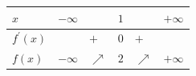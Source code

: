 \documentclass[border=.4pt]{standalone}
\begin{document}
\color{ink}\begin{tabular}{|>{\centering\arraybackslash}m{1.7cm}|>{\centering\arraybackslash}m{1.25cm}|>{\centering\arraybackslash}m{1.25cm}|>{\centering\arraybackslash}m{1.25cm}|>{\centering\arraybackslash}m{1.25cm}|>{\centering\arraybackslash}m{1.25cm}|}\hline
\cellcolor{head}$x$ & \cellcolor{head}$-\infty$ & \cellcolor{head} & \cellcolor{head}$1$ & \cellcolor{head} & \cellcolor{head}$+\infty$ \\ \hline
\cellcolor{head}$f^{\prime}(x)$ &  & $+$ & $0$ & $+$ &  \\ \hline
\cellcolor{head}$f(x)$ & $-\infty$ & \color{focus}\large $\nearrow$ & $2$ & \color{focus}\large $\nearrow$ & $+\infty$ \\ \hline\end{tabular}
\end{document}
